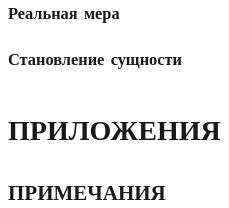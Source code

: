 \documentclass[a5paper, 11pt, twoside, onecolumn, openany]{memoir}
\begin{document}



\section{Реальная мера}


\section{Становление сущности}


\backmatter


\part*{ПРИЛОЖЕНИЯ}


\clearpage

\chapter[\mdseries Примечания]{ПРИМЕЧАНИЯ}


\clearpage
\tableofcontents*
\clearpage
\end{document}
